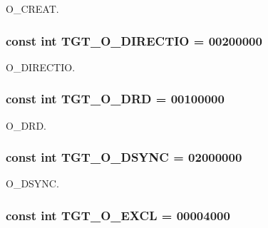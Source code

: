 O\_\-CREAT. \hypertarget{classAlphaLinux_a0a80dc00bd46d433f1ff0d38da2f5ded}{
\subsubsection[{TGT\_\-O\_\-DIRECTIO}]{\setlength{\rightskip}{0pt plus 5cm}const int {\bf TGT\_\-O\_\-DIRECTIO} = 00200000}}
\label{classAlphaLinux_a0a80dc00bd46d433f1ff0d38da2f5ded}


O\_\-DIRECTIO. \hypertarget{classAlphaLinux_a83feaef06c27596d44d489ec51e197fd}{
\subsubsection[{TGT\_\-O\_\-DRD}]{\setlength{\rightskip}{0pt plus 5cm}const int {\bf TGT\_\-O\_\-DRD} = 00100000}}
\label{classAlphaLinux_a83feaef06c27596d44d489ec51e197fd}


O\_\-DRD. \hypertarget{classAlphaLinux_ac8d84ac6abb2d868443e4559bed55ebe}{
\subsubsection[{TGT\_\-O\_\-DSYNC}]{\setlength{\rightskip}{0pt plus 5cm}const int {\bf TGT\_\-O\_\-DSYNC} = 02000000}}
\label{classAlphaLinux_ac8d84ac6abb2d868443e4559bed55ebe}


O\_\-DSYNC. \hypertarget{classAlphaLinux_a10d5d118d15b51ebdd4b16dc78342d1d}{
\subsubsection[{TGT\_\-O\_\-EXCL}]{\setlength{\rightskip}{0pt plus 5cm}const int {\bf TGT\_\-O\_\-EXCL} = 00004000}}
\label{classAlphaLinux_a10d5d118d15b51ebdd4b16dc78342d1d}


